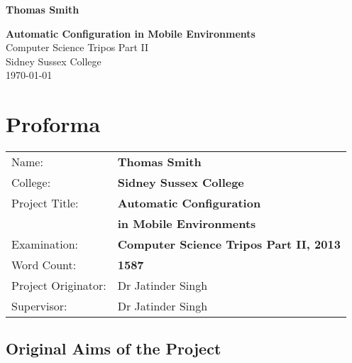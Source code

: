 \documentclass[12pt,twoside,notitlepage]{report}
\begin{document}





\pagestyle{empty}

\hfill{\LARGE \bf Thomas Smith}

\vspace*{60mm}
\begin{center}
\Huge
{\bf Automatic Configuration in Mobile Environments} \\
\vspace*{5mm}
Computer Science Tripos Part II \\
\vspace*{5mm}
Sidney Sussex College \\
\vspace*{5mm}
\today  %
\end{center}

\cleardoublepage


\setcounter{page}{1}
\pagestyle{plain}

\chapter*{Proforma}

{\large
\begin{tabular}{ll}
Name:               & \bf Thomas Smith	\\
College:            & \bf Sidney Sussex College	\\
Project Title:      & \bf Automatic Configuration \\ &\bf in Mobile Environments	\\
Examination:        & \bf Computer Science Tripos Part II, 2013 	\\
Word Count:         & \bf 1587\footnotemark[1] \\
Project Originator: & Dr Jatinder Singh		\\
Supervisor:         & Dr Jatinder Singh		\\ 
\end{tabular}
}



\section*{Original Aims of the Project}
\end{document}
